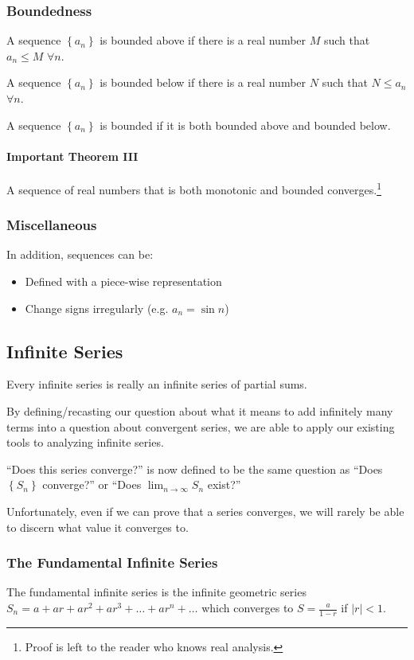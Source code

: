 \documentclass{article}
\begin{document}
\subsubsection{Boundedness} \label{monoton}
A sequence $\left\{ a_n \right\}$ is bounded above if there is a real number $M$ such that $a_n \le M$ $\forall n$.

A sequence $\left\{ a_n \right\}$ is bounded below if there is a real number $N$ such that $N \le a_n$ $\forall n$.

A sequence $\left\{ a_n \right\}$ is bounded if it is both bounded above and bounded below.

\paragraph{Important Theorem III}
A sequence of real numbers that is both monotonic and bounded converges.\footnote{Proof is left to the reader who knows real analysis.}

\subsubsection{Miscellaneous}
In addition, sequences can be:
\begin{itemize}
    \item Defined with a piece-wise representation
    \item Change signs irregularly (e.g. $a_n = \sin{n}$)
\end{itemize}

\subsection{Infinite Series}
Every infinite series is really an infinite series of partial sums.

By defining/recasting our question about what it means to add infinitely many terms into a question about convergent series, we are able to apply our existing tools to analyzing infinite series.

``Does this series converge?'' is now defined to be the same question as ``Does $\left\{ S_n \right\}$ converge?'' or ``Does $\lim_{n \to \infty} S_n$ exist?''

Unfortunately, even if we can prove that a series converges, we will rarely be able to discern what value it converges to.

\subsubsection{The Fundamental Infinite Series}
The fundamental infinite series is the infinite geometric series
$S_n = a + ar + ar^2 + ar^3 + \ldots + ar^n + \ldots$
which converges to $S = \frac{a}{1-r}$ if $|r| < 1$.
\end{document}
